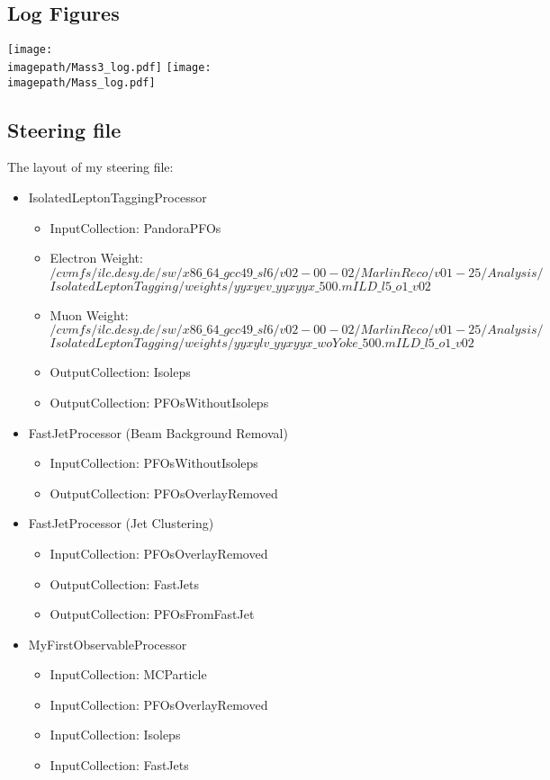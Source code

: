 \subsection{Log Figures}
\label{App:LogFigures}
\texttt{[image: \\imagepath/Mass3\_log.pdf]}
\texttt{[image: \\imagepath/Mass\_log.pdf]}

\subsection{Steering file}
\label{App:SteeringFile}

The layout of my steering file:

\begin{itemize}
	\item IsolatedLeptonTaggingProcessor
		\begin{itemize}
			\item InputCollection: PandoraPFOs
			\item Electron Weight:\\
            \texttt{$/cvmfs/ilc.desy.de/sw/x86\_64\_gcc49\_sl6/v02-00-02/MarlinReco/v01-25/Analysis/$}
            \texttt{$IsolatedLeptonTagging/weights/yyxyev\_yyxyyx\_500.mILD\_l5\_o1\_v02$}
			\item Muon Weight: \\
            \texttt{$/cvmfs/ilc.desy.de/sw/x86\_64\_gcc49\_sl6/v02-00-02/MarlinReco/v01-25/Analysis/$}
            \texttt{$IsolatedLeptonTagging/weights/yyxylv\_yyxyyx\_woYoke\_500.mILD\_l5\_o1\_v02$}
			\item OutputCollection: Isoleps
			\item OutputCollection: PFOsWithoutIsoleps
		\end{itemize}
	\item FastJetProcessor (Beam Background Removal)
		\begin{itemize}
			\item InputCollection: PFOsWithoutIsoleps
			\item OutputCollection: PFOsOverlayRemoved
		\end{itemize}
	\item FastJetProcessor (Jet Clustering)
		\begin{itemize}
			\item InputCollection: PFOsOverlayRemoved
			\item OutputCollection: FastJets
			\item OutputCollection: PFOsFromFastJet
		\end{itemize}
	\item MyFirstObservableProcessor
		\begin{itemize}
			\item InputCollection: MCParticle
			\item InputCollection: PFOsOverlayRemoved
			\item InputCollection: Isoleps
			\item InputCollection: FastJets
		\end{itemize}
\end{itemize}
